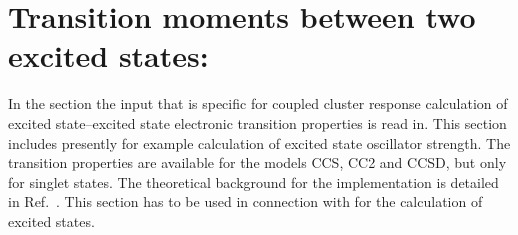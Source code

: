 
\section{Transition moments between two excited states: }
\label{sec:ccqr2r}

In the  section the input that is
specific for coupled cluster response calculation of excited state--excited state
electronic transition properties is read in.
This section includes presently for example calculation of excited state
oscillator strength.
The transition properties are available for the models CCS, CC2 and CCSD,
but only for singlet states.
The theoretical background for the implementation is 
detailed in Ref.\ \cite{Christiansen:CCLR,Christiansen:QEL}.
This section has to be used in connection with  for the 
calculation of excited states.

\begin{center}
\end{center}

